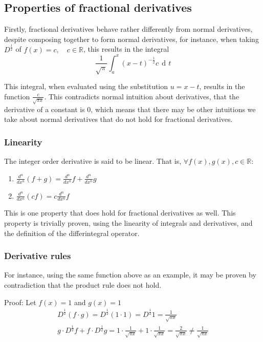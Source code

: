 \documentclass{article}
\DeclareMathOperator{\di}{\,d\!}
\begin{document}
\subsection{Properties of fractional derivatives}

Firstly, fractional derivatives behave rather differently from normal
derivatives, despite composing together to form normal derivatives, for
instance, when taking $D^\frac{1}{2}$ of $f(x)=c, \quad c \in \mathbb{R}$, this
results in the integral
$$
\frac{1}{\sqrt{\pi}} \int_a^x \left(x-t\right)^{-\frac{1}{2}} c \di t
$$

This integral, when evaluated using the substitution $u=x-t$, results in the
function $\frac{c}{\sqrt{\pi x}}$. This contradicts normal intuition about
derivatives, that the derivative of a constant is $0$, which means that there
may be other intuitions we take about normal derivatives that do not hold for
fractional derivatives.

\subsubsection{Linearity}

The integer order derivative is said to be linear. That is, $\forall f(x),g(x),c \in \mathbb{R}$:
\begin{enumerate}
	\item{$\frac{d^n}{dx^n} \left(f + g\right) = \frac{d^n}{dx^n} f + \frac{d^n}{dx^n} g$}
	\item{$\frac{d^n}{dx^n} \left(cf\right) = c\frac{d^n}{dx^n} f$}
\end{enumerate}

This is one property that does hold for fractional derivatives as well. This
property is trivially proven, using the linearity of integrals and derivatives,
and the definition of the differintegral operator.

\subsubsection{Derivative rules}

For instance, using the same function above as an example, it may be proven by
contradiction that the product rule does not hold.

Proof: Let $f(x) = 1$ and $g(x) = 1$
\begin{gather*}
	D^\frac{1}{2} \left(f \cdot g\right) = D^\frac{1}{2} \left(1 \cdot 1\right) = D^\frac{1}{2} 1 = \frac{1}{\sqrt{\pi x}} \\
	g \cdot D^\frac{1}{2} f + f \cdot D^\frac{1}{2} g = 1 \cdot \frac{1}{\sqrt{\pi x}} + 1 \cdot \frac{1}{\sqrt{\pi x}} = \frac{2}{\sqrt{\pi x}} \neq \frac{1}{\sqrt{\pi x}}
\end{gather*}
\end{document}
